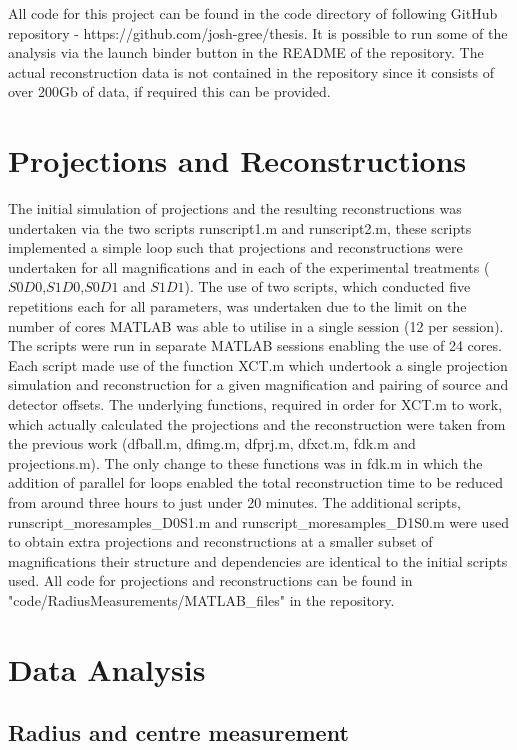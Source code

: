 \documentclass[
  twoside,
  11pt, a4paper,
  footinclude=true,
  headinclude=true,
  cleardoublepage=empty
]{scrbook}
\begin{document}
All code for this project can be found in the code directory of following GitHub repository - https://github.com/josh-gree/thesis. It is possible to run some of the analysis via the launch binder button in the README of the repository. The actual reconstruction data is not contained in the repository since it consists of over 200Gb of data, if required this can be provided.

\section{Projections and Reconstructions}

The initial simulation of projections and the resulting reconstructions was undertaken via the two scripts runscript1.m and runscript2.m, these scripts implemented a simple loop such that projections and reconstructions were undertaken for all magnifications and in each of the experimental treatments ($S0D0$,$S1D0$,$S0D1$ and $S1D1$). The use of two scripts, which conducted five repetitions each for all parameters, was undertaken due to the limit on the number of cores MATLAB was able to utilise in a single session (12 per session). The scripts were run in separate MATLAB sessions enabling the use of 24 cores. Each script made use of the function XCT.m which undertook a single projection simulation and reconstruction for a given magnification and pairing of source and detector offsets. The underlying functions, required in order for XCT.m to work, which actually calculated the projections and the reconstruction were taken from the previous work \cite{Athens2015} (dfball.m, dfimg.m, dfprj.m, dfxct.m, fdk.m and projections.m). The only change to these functions was in fdk.m in which the addition of parallel for loops enabled the total reconstruction time to be reduced from around three hours to just under 20 minutes. The additional scripts, runscript\_moresamples\_D0S1.m and runscript\_moresamples\_D1S0.m were used to obtain extra projections and reconstructions at a smaller subset of magnifications their structure and dependencies are identical to the initial scripts used. All code for projections and reconstructions can be found in "code/RadiusMeasurements/MATLAB\_files" in the repository.

\section{Data Analysis}

\subsection{Radius and centre measurement}
\end{document}
